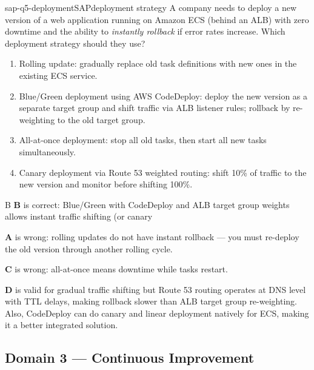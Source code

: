 
\begin{question}{sap-q5-deployment}{SAP}{deployment strategy}
A company needs to deploy a new version of a web application running on Amazon ECS (behind an ALB) with zero downtime and the ability to \emph{instantly rollback} if error rates increase. Which deployment strategy should they use?

\begin{enumerate}[label=\Alph*.]
  \item Rolling update: gradually replace old task definitions with new ones in the existing ECS service.
  \item Blue/Green deployment using AWS CodeDeploy: deploy the new version as a separate target group and shift traffic via ALB listener rules; rollback by re-weighting to the old target group.
  \item All-at-once deployment: stop all old tasks, then start all new tasks simultaneously.
  \item Canary deployment via Route 53 weighted routing: shift 10\% of traffic to the new version and monitor before shifting 100\%.
\end{enumerate}
\end{question}

\begin{answer}{B}
\textbf{B} is correct: Blue/Green with CodeDeploy and ALB target group weights allows instant traffic shifting (or canary %

\textbf{A} is wrong: rolling updates do not have instant rollback --- you must re-deploy the old version through another rolling cycle.

\textbf{C} is wrong: all-at-once means downtime while tasks restart.

\textbf{D} is valid for gradual traffic shifting but Route 53 routing operates at DNS level with TTL delays, making rollback slower than ALB target group re-weighting. Also, CodeDeploy can do canary and linear deployment natively for ECS, making it a better integrated solution.
\end{answer}


\subsection{Domain 3 --- Continuous Improvement}

